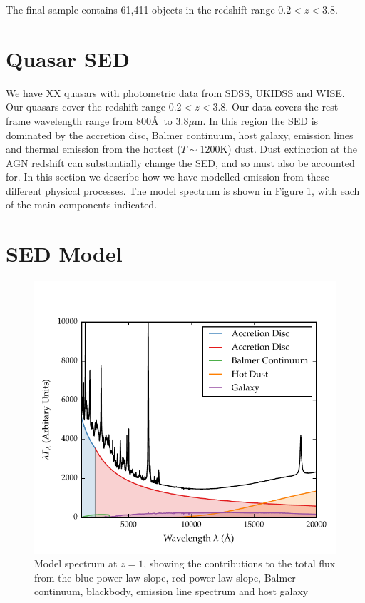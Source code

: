 The final sample contains 61,411 objects in the redshift range $0.2 < z < 3.8$. 

\section{Quasar SED}

We have XX quasars with photometric data from SDSS, UKIDSS and WISE. 
Our quasars cover the redshift range $0.2 < z < 3.8$. 
Our data covers the rest-frame wavelength range from 800\AA\, to 3.8$\mu$m. 
In this region the \ac{SED} is dominated by the accretion disc, Balmer continuum, host galaxy, emission lines and thermal emission from the hottest ($T\sim1200$K) dust. 
Dust extinction at the \ac{AGN} redshift can substantially change the \ac{SED}, and so must also be accounted for. 
In this section we describe how we have modelled emission from these different physical processes. 
The model spectrum is shown in Figure \ref{fig:modelsed}, with each of the main components indicated. 

\section{SED Model}

\begin{figure}
  \centering
  \includegraphics[width=\textwidth]{figures/chapter05/sed_model.pdf}
  \caption{Model spectrum at $z=1$, showing the contributions to the total flux from the blue power-law slope, red power-law slope, Balmer continuum, blackbody, emission line spectrum and host galaxy}
  \label{fig:modelsed}
\end{figure}


